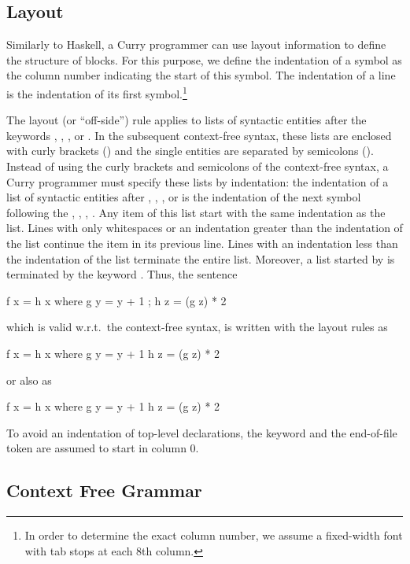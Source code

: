 \subsection{Layout}
Similarly to Haskell, a Curry programmer can use layout information
to define the structure of blocks. For this purpose, we define
the indentation of a symbol as the column number indicating
the start of this symbol. The indentation of a line is the
indentation of its first symbol.\footnote{In order to determine
the exact column number, we assume a fixed-width font with
tab stops at each 8th column.}

The layout (or ``off-side'') rule applies to lists of syntactic
entities after the keywords ,
, , or .
In the subsequent context-free syntax,
these lists are enclosed with
curly brackets (\term{\{ \}}) and the single entities are
separated by semicolons (\term{;}). Instead of using the curly
brackets and semicolons of the context-free syntax,
a Curry programmer must specify these lists
by indentation: the indentation of a list of syntactic
entities after , , , or  is the
indentation of the next symbol following the
, , , . Any item of this list
start with the same indentation as the list. Lines with only whitespaces or
an indentation greater than the indentation of the list continue
the item in its previous line. Lines with an indentation less than
the indentation of the list terminate the entire list.
Moreover, a list started by  is terminated by the
keyword . Thus, the sentence
\begin{curry}
f x = h x where { g y = y + 1 ; h z = (g z) * 2 }
\end{curry}
which is valid w.r.t.\ the context-free syntax, is written
with the layout rules as
\begin{curry}
f x = h x
 where g y = y + 1
       h z = (g z) * 2
\end{curry}
or also as
\begin{curry}
f x = h x  where
  g y = y + 1
  h z = (g z)
          * 2
\end{curry}
To avoid an indentation of top-level declarations,
the keyword  and the end-of-file token are
assumed to start in column 0.

\subsection{Context Free Grammar}

